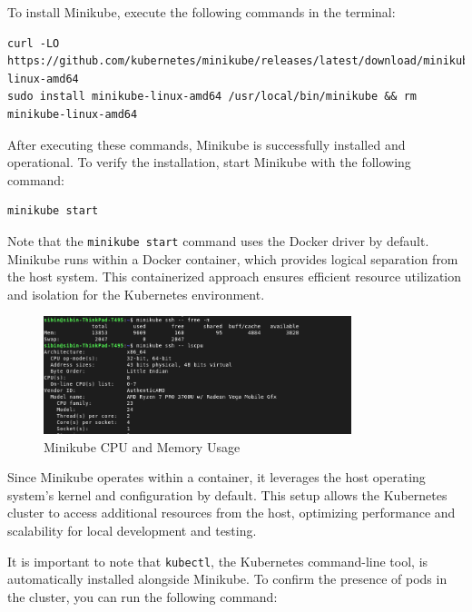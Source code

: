 To install Minikube, execute the following commands in the terminal:

\begin{lstlisting}
curl -LO https://github.com/kubernetes/minikube/releases/latest/download/minikube-linux-amd64
sudo install minikube-linux-amd64 /usr/local/bin/minikube && rm minikube-linux-amd64
\end{lstlisting}

After executing these commands, Minikube is successfully installed and operational. To verify the installation, start Minikube with the following command:

\begin{lstlisting}
minikube start
\end{lstlisting}

Note that the \texttt{minikube start} command uses the Docker driver by default. Minikube runs within a Docker container, which provides logical separation from the host system. This containerized approach ensures efficient resource utilization and isolation for the Kubernetes environment.

\begin{figure}[h!]
    \centering
    \includegraphics[width=0.8\textwidth]{implementation/minikube-cpunmem.png}
    \caption{Minikube CPU and Memory Usage}
    \label{fig:minikube-cpu-and-memory}
\end{figure}

Since Minikube operates within a container, it leverages the host operating system's kernel and configuration by default. This setup allows the Kubernetes cluster to access additional resources from the host, optimizing performance and scalability for local development and testing.

It is important to note that \texttt{kubectl}, the Kubernetes command-line tool, is automatically installed alongside Minikube. To confirm the presence of pods in the cluster, you can run the following command:

